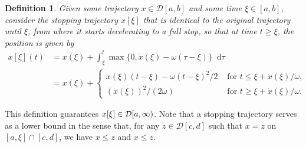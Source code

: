 \documentclass[a4paper]{article}
\theoremstyle{definition}
\theoremstyle{plain}
\newtheorem{define}{Definition\hspace{0.25em}\ignorespaces}
\newcommand*\diff{\mathop{}\!\mathrm{d}}
\begin{document}
\newpage

\begin{define}\label{def:stopping-trajectory}
  Given some trajectory $x \in \mathcal{D}[a,b]$ and some time $\xi \in [a, b]$, consider the
  \emph{stopping trajectory} $x[\xi]$ that is identical to the original trajectory until
  $\xi$, from where it starts decelerating to a full stop, so that at time
  $t \geq \xi$, the position is given by
\begin{subequations}
\begin{align}
  x[\xi](t) &= x(\xi) + \int_{\xi}^{t} \max\{0, \dot{x}(\xi) - \omega(\tau-\xi) \} \diff \tau \\
                     &= x(\xi) + \begin{cases}
                                        \dot{x}(\xi)(t-\xi) - \omega(t-\xi)^{2} / 2 &\text{ for } t \leq \xi + \dot{x}(\xi) / \omega , \\
                                        {(\dot{x}(\xi))}^{2} / (2 \omega) &\text{ for } t \geq \xi + \dot{x}(\xi) / \omega .
                                        \end{cases} \label{eq:underbound}
\end{align}
\end{subequations}
\end{define}

This definition guarantees $x[\xi] \in \mathcal{D}[a,\infty)$.
%
Note that a stopping trajectory serves as a lower bound in the sense that, for any
$z \in\mathcal{D}[c,d]$ such that $x = z$ on $[a, \xi] \cap [c, d]$, we
have $x \leq z$ and $\dot{x} \leq \dot{z}$.
%

\newpage
\end{document}
